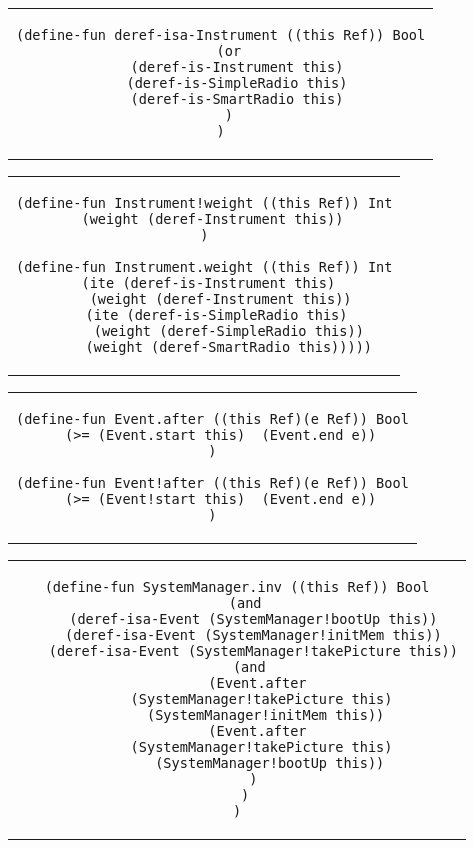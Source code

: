 \begin{center}
\begin{tabular}{c}
\begin{lstlisting}
(define-fun deref-isa-Instrument ((this Ref)) Bool
  (or
    (deref-is-Instrument this)
    (deref-is-SimpleRadio this)
    (deref-is-SmartRadio this)
  )
)
\end{lstlisting}
\end{tabular}
\end{center}

\hline

\begin{center}
\begin{tabular}{c}
\begin{lstlisting}
(define-fun Instrument!weight ((this Ref)) Int
  (weight (deref-Instrument this))
)

(define-fun Instrument.weight ((this Ref)) Int
  (ite (deref-is-Instrument this) 
    (weight (deref-Instrument this))
    (ite (deref-is-SimpleRadio this) 
      (weight (deref-SimpleRadio this))
      (weight (deref-SmartRadio this)))))
\end{lstlisting}
\end{tabular}
\end{center}

\hline

\begin{center}
\begin{tabular}{c}
\begin{lstlisting}
(define-fun Event.after ((this Ref)(e Ref)) Bool
  (>= (Event.start this)  (Event.end e))
)

(define-fun Event!after ((this Ref)(e Ref)) Bool
  (>= (Event!start this)  (Event.end e))
)
\end{lstlisting}
\end{tabular}
\end{center}

\hline

\begin{center}
\begin{tabular}{c}
\begin{lstlisting}
(define-fun SystemManager.inv ((this Ref)) Bool
  (and
    (deref-isa-Event (SystemManager!bootUp this))
    (deref-isa-Event (SystemManager!initMem this))
    (deref-isa-Event (SystemManager!takePicture this))
    (and 
      (Event.after 
        (SystemManager!takePicture this)  
        (SystemManager!initMem this)) 
      (Event.after 
        (SystemManager!takePicture this)  
        (SystemManager!bootUp this))
    )
  )
)
\end{lstlisting}
\end{tabular}
\end{center}

